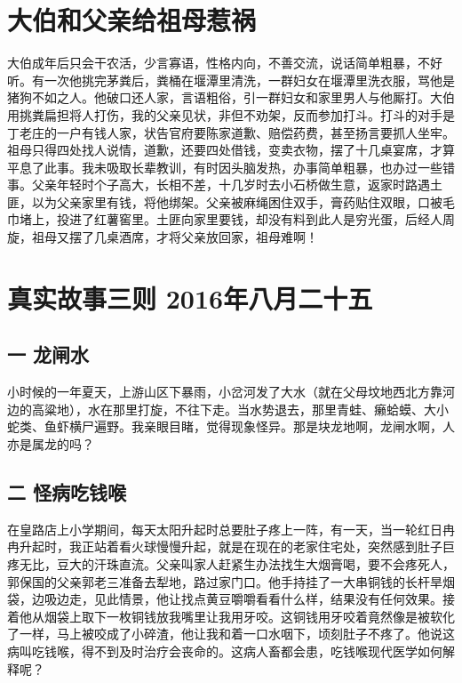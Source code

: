 \section*{大伯和父亲给祖母惹祸}

大伯成年后只会干农活，少言寡语，性格内向，不善交流，说话简单粗暴，不好听。有一次他挑完茅粪后，粪桶在堰潭里清洗，一群妇女在堰潭里洗衣服，骂他是猪狗不如之人。他破口还人家，言语粗俗，引一群妇女和家里男人与他厮打。大伯用挑粪扁担将人打伤，我的父亲见状，非但不劝架，反而参加打斗。打斗的对手是丁老庄的一户有钱人家，状告官府要陈家道歉、赔偿药费，甚至扬言要抓人坐牢。祖母只得四处找人说情，道歉，还要四处借钱，变卖衣物，摆了十几桌宴席，才算平息了此事。我未吸取长辈教训，有时因头脑发热，办事简单粗暴，也办过一些错事。父亲年轻时个子高大，长相不差，十几岁时去小石桥做生意，返家时路遇土匪，以为父亲家里有钱，将他绑架。父亲被麻绳困住双手，膏药贴住双眼，口被毛巾堵上，投进了红薯窖里。土匪向家里要钱，却没有料到此人是穷光蛋，后经人周旋，祖母又摆了几桌酒席，才将父亲放回家，祖母难啊！


\section*{真实故事三则 2016年八月二十五}


\subsection*{一 龙闸水}

小时候的一年夏天，上游山区下暴雨，小岔河发了大水（就在父母坟地西北方靠河边的高粱地），水在那里打旋，不往下走。当水势退去，那里青蛙、癞蛤蟆、大小蛇类、鱼虾横尸遍野。我亲眼目睹，觉得现象怪异。那是块龙地啊，龙闸水啊，人亦是属龙的吗？


\subsection*{二 怪病吃钱喉}

在皇路店上小学期间，每天太阳升起时总要肚子疼上一阵，有一天，当一轮红日冉冉升起时，我正站着看火球慢慢升起，就是在现在的老家住宅处，突然感到肚子巨疼无比，豆大的汗珠直流。父亲叫家人赶紧生办法找生大烟膏喝，要不会疼死人，郭保国的父亲郭老三准备去犁地，路过家门口。他手持挂了一大串铜钱的长杆旱烟袋，边吸边走，见此情景，他让找点黄豆嚼嚼看看什么样，结果没有任何效果。接着他从烟袋上取下一枚铜钱放我嘴里让我用牙咬。这铜钱用牙咬着竟然像是被软化了一样，马上被咬成了小碎渣，他让我和着一口水咽下，顷刻肚子不疼了。他说这病叫吃钱喉，得不到及时治疗会丧命的。这病人畜都会患，吃钱喉现代医学如何解释呢？


